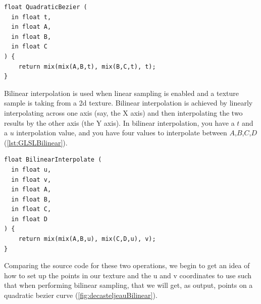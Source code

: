 \documentclass{jcgt}
\begin{document}
\begin{lstlisting}[caption={GLSL De Casteljeau Algorithm For a Quadratic Bezier Curve}, label={lst:GLSLDeCasteljeau}]
float QuadraticBezier (
  in float t,
  in float A,
  in float B,
  in float C
) {
    return mix(mix(A,B,t), mix(B,C,t), t);
}
\end{lstlisting}

Bilinear interpolation is used when linear sampling is enabled and a texture sample is taking from a 2d texture.  Bilinear interpolation is achieved by linearly interpolating across one axis (say, the X axis) and then interpolating the two results by the other axis (the Y axis).  In bilinear interpolation, you have a $t$ and a $u$ interpolation value, and you have four values to interpolate between $A$,$B$,$C$,$D$ (\autoref{lst:GLSLBilinear}).

\begin{lstlisting}[caption={GLSL implementation of bilinear interpolation between four floats}, label={lst:GLSLBilinear}]
float BilinearInterpolate (
  in float u,
  in float v,
  in float A,
  in float B,
  in float C,
  in float D
) {
    return mix(mix(A,B,u), mix(C,D,u), v);
}
\end{lstlisting}

Comparing the source code for these two operations, we begin to get an idea of how to set up the points in our texture and the u and v coordinates to use such that when performing bilinear sampling, that we will get, as output, points on a quadratic bezier curve (\autoref{fig:decasteljeauBilinear}).
\end{document}
